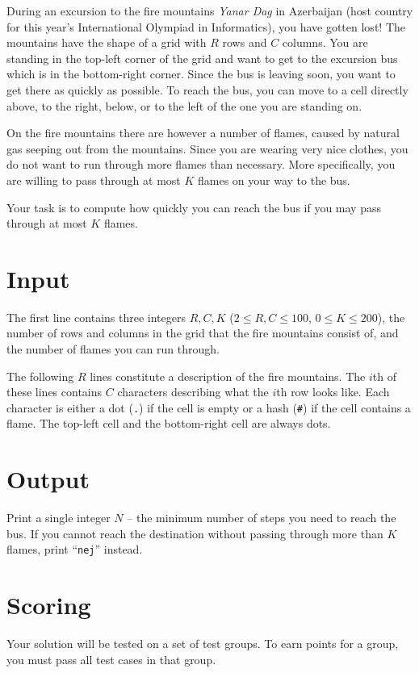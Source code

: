 During an excursion to the fire mountains \emph{Yanar Dag} in Azerbaijan (host country for this year's International Olympiad in Informatics), you have gotten lost!
The mountains have the shape of a grid with $R$ rows and $C$ columns.
You are standing in the top-left corner of the grid and want to get to the excursion bus which is in the bottom-right corner.
Since the bus is leaving soon, you want to get there as quickly as possible.
To reach the bus, you can move to a cell directly above, to the right, below, or to the left of the one you are standing on.

On the fire mountains there are however a number of flames, caused by natural gas seeping out from the mountains.
Since you are wearing very nice clothes, you do not want to run through more flames than necessary.
More specifically, you are willing to pass through at most $K$ flames on your way to the bus.

Your task is to compute how quickly you can reach the bus if you may pass through at most $K$ flames.

\section*{Input}
The first line contains three integers $R, C, K$ ($2 \le R, C \le 100$, $0 \le K \le 200$), the number of rows and columns in the grid that the fire mountains consist of, and the number of flames you can run through.

The following $R$ lines constitute a description of the fire mountains.
The $i$th of these lines contains $C$ characters describing what the $i$th row looks like.
Each character is either a dot (\texttt{.}) if the cell is empty or a hash (\texttt{\#}) if the cell contains a flame. The top-left cell and the bottom-right cell are always dots.

\section*{Output}
Print a single integer $N$ -- the minimum number of steps you need to reach the bus.
If you cannot reach the destination without passing through more than $K$ flames, print ``\texttt{nej}'' instead.

\section*{Scoring}
Your solution will be tested on a set of test groups.
To earn points for a group, you must pass all test cases in that group.

